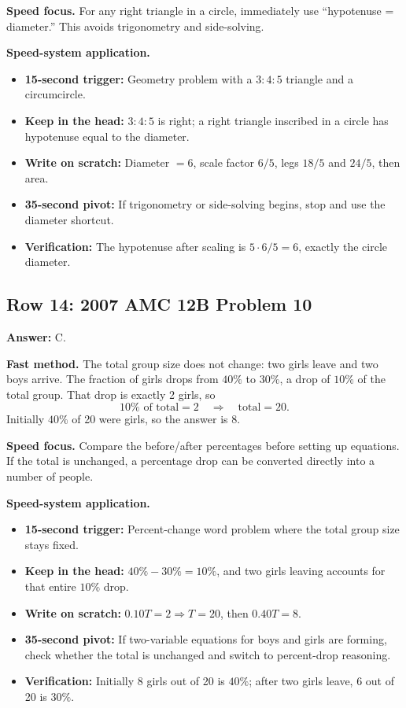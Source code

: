 \documentclass[11pt]{article}
\begin{document}
\textbf{Speed focus.} For any right triangle in a circle, immediately use ``hypotenuse = diameter.'' This avoids trigonometry and side-solving.

\textbf{Speed-system application.}
\begin{itemize}
  \item \textbf{15-second trigger:} Geometry problem with a \(3:4:5\) triangle and a circumcircle.
  \item \textbf{Keep in the head:} \(3:4:5\) is right; a right triangle inscribed in a circle has hypotenuse equal to the diameter.
  \item \textbf{Write on scratch:} Diameter \(=6\), scale factor \(6/5\), legs \(18/5\) and \(24/5\), then area.
  \item \textbf{35-second pivot:} If trigonometry or side-solving begins, stop and use the diameter shortcut.
  \item \textbf{Verification:} The hypotenuse after scaling is \(5\cdot6/5=6\), exactly the circle diameter.
\end{itemize}

\subsection{Row 14: 2007 AMC 12B Problem 10}

\textbf{Answer:} C.

\textbf{Fast method.} The total group size does not change: two girls leave and two boys arrive. The fraction of girls drops from \(40\%\) to \(30\%\), a drop of \(10\%\) of the total group. That drop is exactly 2 girls, so
\[
10\%\text{ of total}=2 \quad\Rightarrow\quad \text{total}=20.
\]
Initially \(40\%\) of 20 were girls, so the answer is \(8\).

\textbf{Speed focus.} Compare the before/after percentages before setting up equations. If the total is unchanged, a percentage drop can be converted directly into a number of people.

\textbf{Speed-system application.}
\begin{itemize}
  \item \textbf{15-second trigger:} Percent-change word problem where the total group size stays fixed.
  \item \textbf{Keep in the head:} \(40\%-30\%=10\%\), and two girls leaving accounts for that entire \(10\%\) drop.
  \item \textbf{Write on scratch:} \(0.10T=2\Rightarrow T=20\), then \(0.40T=8\).
  \item \textbf{35-second pivot:} If two-variable equations for boys and girls are forming, check whether the total is unchanged and switch to percent-drop reasoning.
  \item \textbf{Verification:} Initially 8 girls out of 20 is \(40\%\); after two girls leave, 6 out of 20 is \(30\%\).
\end{itemize}
\end{document}
